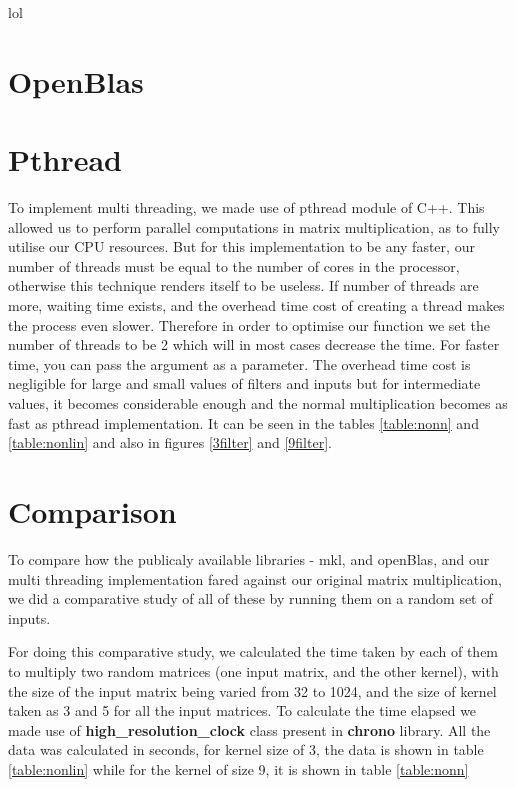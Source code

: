 \documentclass[a4paper]{article}
\begin{document}
lol \cite{small}
\section{OpenBlas}


\section{Pthread}
To implement multi threading, we made use of pthread module of C++. This allowed us to perform parallel computations in matrix multiplication, as to fully utilise our CPU resources. But for this implementation to be any faster, our number of threads must be equal to the number of cores in the processor, otherwise this technique renders itself to be useless. If number of threads are more, waiting time exists, and the overhead time cost of creating a thread makes the process even slower. Therefore in order to optimise our function we set the number of threads to be 2 which will in most cases decrease the time. For faster time, you can pass the argument as a parameter.
The overhead time cost is negligible for large and small values of filters and inputs but for intermediate values, it becomes considerable enough and the normal multiplication becomes as fast as pthread implementation. It can be seen in the tables \ref{table:nonn} and \ref{table:nonlin} and also in figures \ref{3filter} and \ref{9filter}.


\section{Comparison}
To compare how the publicaly available libraries - mkl, and openBlas, and our multi threading implementation fared against our original matrix multiplication, we did a comparative study of all of these by running them on a random set of inputs.

For doing this comparative study, we calculated the time taken by each of them to multiply two random matrices (one input matrix, and the other kernel), with the size of the input matrix being varied from 32 to 1024, and the size of kernel taken as 3 and 5 for all the input matrices. To calculate the time elapsed we made use of \textbf{high\_resolution\_clock} class present in \textbf{chrono} library. All the data was calculated in seconds, for kernel size of 3, the data is shown in table \ref{table:nonlin} while for the kernel of size 9, it is shown in table \ref{table:nonn}  
\end{document}

